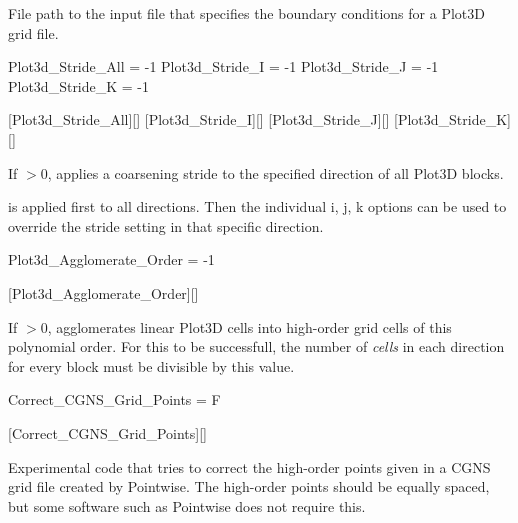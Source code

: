 \begin{nmldescbody}
File path to the input file that specifies the boundary conditions for a
Plot3D grid file.
\end{nmldescbody}


\begin{nmldescitem}
Plot3d_Stride_All = -1
Plot3d_Stride_I   = -1 
Plot3d_Stride_J   = -1
Plot3d_Stride_K   = -1
\end{nmldescitem}
[Plot3d\_Stride\_All][]%
[Plot3d\_Stride\_I][]%
[Plot3d\_Stride\_J][]%
[Plot3d\_Stride\_K][]%
 
\begin{nmldescbody}
If $> 0$, applies a coarsening stride to the specified direction
of all Plot3D blocks.
 
 is applied first to all directions.
%
Then the individual i, j, k options can be used to override the
stride setting in that specific direction.
\end{nmldescbody}


\begin{nmldescitem}
Plot3d_Agglomerate_Order = -1
\end{nmldescitem}
[Plot3d\_Agglomerate\_Order][]

\begin{nmldescbody}
If $> 0$, agglomerates linear Plot3D cells into high-order grid cells of
this polynomial order.
%
For this to be successfull, the number of {\em cells} in each direction
for every block must be divisible by this value.
\end{nmldescbody}


\begin{nmldescitem}
Correct_CGNS_Grid_Points = F
\end{nmldescitem}
[Correct\_CGNS\_Grid\_Points][]

\begin{nmldescbody}
Experimental code that tries to correct the high-order points given in a
CGNS grid file created by Pointwise. The high-order points should be equally
spaced, but some software such as Pointwise does not require this.
\end{nmldescbody}

